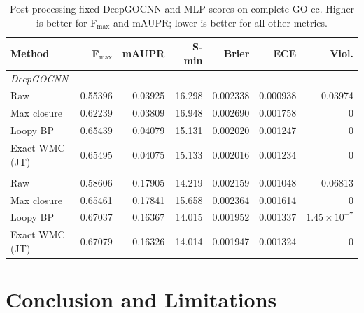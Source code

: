 \documentclass[letterpaper]{article}
\begin{document}
\begin{table}[t]
\centering
\scriptsize
\setlength{\tabcolsep}{1.2pt}
\begin{tabular}{lrrrrrr}
\toprule
Method
& F$_{\max}$
& mAUPR
& S-min
& Brier
& ECE
& Viol. \\
\midrule

\multicolumn{7}{l}{\textit{DeepGOCNN}} \\

Raw
& 0.55396
& 0.03925
& 16.298
& 0.002338
& 0.000938
& 0.03974 \\

Max closure
& 0.62239
& 0.03809
& 16.948
& 0.002690
& 0.001758
& 0 \\

Loopy BP
& 0.65439
& 0.04079
& 15.131
& 0.002020
& 0.001247
& 0 \\

Exact WMC (JT)
& 0.65495
& 0.04075
& 15.133
& 0.002016
& 0.001234
& 0 \\

\addlinespace

\multicolumn{7}{l}{\textit{MLP}} \\

Raw
& 0.58606
& 0.17905
& 14.219
& 0.002159
& 0.001048
& 0.06813 \\

Max closure
& 0.65461
& 0.17841
& 15.658
& 0.002364
& 0.001614
& 0 \\

Loopy BP
& 0.67037
& 0.16367
& 14.015
& 0.001952
& 0.001337
& \(1.45{\times}10^{-7}\) \\

Exact WMC (JT)
& 0.67079
& 0.16326
& 14.014
& 0.001947
& 0.001324
& 0 \\

\bottomrule
\end{tabular}
\caption{
Post-processing fixed DeepGOCNN and MLP scores on complete GO cc.
Higher is better for F$_{\max}$ and mAUPR; lower is better for all
other metrics.
}
\label{tab:downstream}
\end{table}



\section{Conclusion and Limitations}\label{sec:conclusion}
\end{document}
